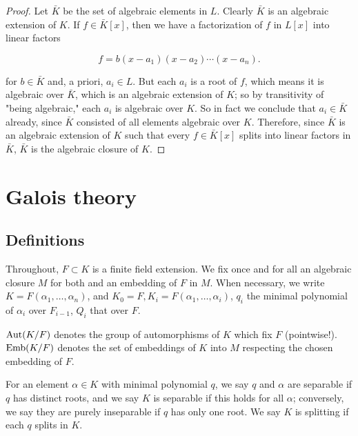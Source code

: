 \begin{proof}
Let $ \bar{K}$ be the set of algebraic elements in $ L$. Clearly $ \bar{K}$ is an algebraic extension of $ K$. If $ f \in \bar{K}[x]$, then we have a factorization of $ f$ in $ L[x]$ into linear factors

\[ f = b(x - a_1)(x - a_2) \dotsb (x - a_n). \]

for $ b \in \bar{K}$ and, a priori, $ a_i \in L$. But each $ a_i$ is a root of $ f$, which means it is algebraic over $ \bar{K}$, which is an algebraic extension of $ K$; so by transitivity of "being algebraic," each $ a_i$ is algebraic over $ K$. So in fact we conclude that $ a_i \in \bar{K}$ already, since $ \bar{K}$ consisted of all elements algebraic over $ K$. Therefore, since $ \bar{K}$ is an algebraic extension of $ K$ such that every $ f \in \bar{K}[x]$ splits into linear factors in $ \bar{K}$, $ \bar{K}$ is the algebraic closure of $ K$.

\end{proof}

\section{Galois theory}
\subsection{Definitions}

Throughout, $F \subset K$ is a finite field extension.  We fix once and for
all an algebraic closure $M$ for both and an embedding of $F$ in $M$.  When
necessary, we write $K = F(\alpha_1, \dots, \alpha_n)$, and $K_0 = F, K_i =
F(\alpha_1, \dots, \alpha_i)$, $q_i$ the minimal polynomial of $\alpha_i$ over
$F_{i - 1}$, $Q_i$ that over $F$.

\begin{definition} $\operatorname{\text{Aut}}(K/F)$ denotes the group of automorphisms of $K$ which fix
$F$ (pointwise!).  $\operatorname{\text{Emb}}(K/F)$ denotes the set of embeddings of $K$ into $M$
respecting the chosen embedding of $F$.
\label{def:gal}
\end{definition}

\begin{definition} For an element $\alpha \in K$ with minimal polynomial $q$, we say
$q$ and $\alpha$ are separable if $q$ has distinct roots, and we say $K$ is
separable if this holds for all $\alpha$; conversely, we say they are purely
inseparable if $q$ has only one root.  We say $K$ is splitting if each $q$
splits in $K$.
\label{def:sepsplit}
\end{definition}

